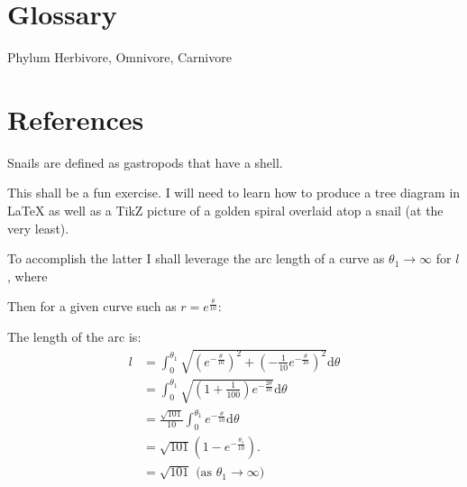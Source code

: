 \documentclass[10pt]{article}
\begin{document}
\section*{Glossary}
Phylum
Herbivore, Omnivore, Carnivore
\section*{References}



Snails are defined as gastropods that have a shell. 

This shall be a fun exercise. I will need to learn how to produce a tree diagram in \LaTeX{} as well as a TikZ picture of a golden spiral overlaid atop a snail (at the very least).

To accomplish the latter I shall leverage the arc length of a curve as \(\theta_1 \rightarrow \infty\) for \(l\), where


Then for a given curve such as \(r = e^\frac{\theta}{10}\):
\begin{center} %
\end{center}

The length of the arc is:
\begin{align*}
    l &= \int^{\theta_1}_{0} \sqrt{(e^{-\frac{\theta}{10}})^2 + (-\frac{1}{10}e^{-\frac{\theta}{10}})^2}\mathrm{d}\theta\\
    &= \int^{\theta_1}_{0} \sqrt{(1+\frac{1}{100})e^{-\frac{2\theta}{10}}} \mathrm{d}\theta\\
    &= \frac{\sqrt{101}}{10} \int^{\theta_1}_0 e^{-\frac{\theta}{10}}\mathrm{d}\theta\\
    &= \sqrt{101}(1 - e^{-\frac{\theta_1}{10}}).\\
    &= \sqrt{101} \text{ (as \(\theta_1 \rightarrow \infty\))}
\end{align*}
\end{document}
